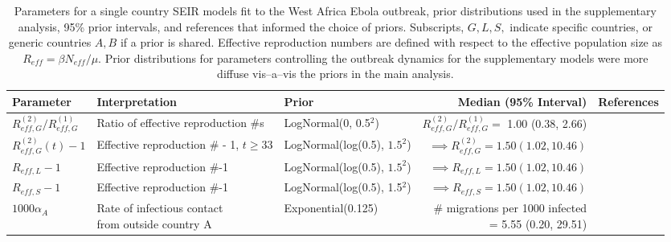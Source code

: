 \begin{table}
	\begin{fullpage}
		\caption[Parameters and priors for supplementary single country SEIR models fit to the West Africa Ebola outbreak.]{Parameters for a single country SEIR models fit to the West Africa Ebola outbreak, prior distributions used in the supplementary analysis, 95\% prior intervals, and references that informed the choice of priors. Subscripts, $ G,L,S, $ indicate specific countries, or generic countries $ A,B $ if a prior is shared. Effective reproduction numbers are defined with respect to the effective population size as $ R_{eff} = \beta N_{eff} /\mu $. Prior distributions for parameters controlling the outbreak dynamics for the supplementary models were more diffuse vis--a--vis the priors in the main analysis.}
		\label{tab:ebola_priors_single_diff}
		\scriptsize
		\centering
		\begin{tabular}{lllrr}
			\hline
			\textbf{Parameter} &  \textbf{Interpretation} & \textbf{Prior} & \textbf{Median (95\% Interval)} & \textbf{References} \\ \hline
			$ R_{eff,G}^{(2)} / R_{eff,G}^{(1)} $ & Ratio of effective reproduction \#s &  LogNormal(0, 0.5$ ^2 $) & $ R_{eff,G}^{(2)} / R_{eff,G}^{(1)} = $ 1.00 (0.38, 2.66) & \cite{chowell2014transmission,chretien2015mathematical,coltart2017ebola,king2015avoidable} \\
			$ R_{eff,G}^{(2)}(t)-1 $ & Effective reproduction \# - 1, $ t\geq33 $ & LogNormal(log(0.5), $ 1.5^2 $) & $ \implies R_{eff,G}^{(2)} = 1.50 (1.02, 10.46)$ &  \cite{chowell2014transmission,chretien2015mathematical,coltart2017ebola,king2015avoidable} \\
			$ R_{eff,L} -1 $ & Effective reproduction \#-1 &  LogNormal(log(0.5), $ 1.5^2 $) & $ \implies R_{eff,L} = 1.50 (1.02, 10.46)$ &  \cite{chowell2014transmission,chretien2015mathematical,coltart2017ebola,king2015avoidable} \\
			$ R_{eff,S}-1 $ & Effective reproduction \#-1 & LogNormal(log(0.5), 1.5$ ^2 $) & $ \implies R_{eff,S} = 1.50 (1.02, 10.46)$ &  \cite{chowell2014transmission,chretien2015mathematical,coltart2017ebola,king2015avoidable}\\
			$ 1000\alpha_{A}$ & \makecell[l]{Rate of infectious contact \\ from outside  country A} & Exponential(0.125) & \makecell[r]{\# migrations per 1000 infected \\ = 5.55 (0.20, 29.51)} & \cite{dudas2017virus}\\ 

\end{tabular}
\end{fullpage}
\end{table}
